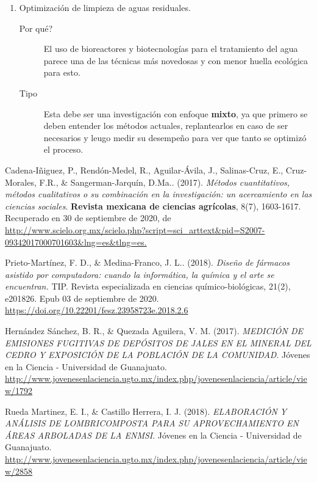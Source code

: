 \documentclass[12pt]{article}
\begin{document}
\begin{enumerate}
	\item Optimizaci\'on de limpieza de aguas residuales.
		\begin{description}
			\item [Por qu\'e?] El uso de bioreactores y biotecnolog\'ias para el tratamiento del agua parece una de las t\'ecnicas m\'as novedosas y con menor huella ecol\'ogica para esto.
			\item [Tipo] Esta debe ser una investigaci\'on con enfoque \textbf{mixto}, ya que primero se deben entender los m\'etodos actuales, replantearlos en caso de ser necesarios y leugo medir su desempe\~no para ver que tanto se optimiz\'o el proceso.
			
		\end{description}
\end{enumerate}


\newpage
\begin{thebibliography}{X}
	 Cadena-Iñiguez, P., Rendón-Medel, R., Aguilar-Ávila, J., Salinas-Cruz, E., Cruz-Morales, F.R., \& Sangerman-Jarquín, D.Ma.. (2017). \textit{Métodos cuantitativos, métodos cualitativos o su combinación en la investigación: un acercamiento en las ciencias sociales}. \textbf{Revista mexicana de ciencias agrícolas}, 8(7), 1603-1617. Recuperado en 30 de septiembre de 2020, de \url{http://www.scielo.org.mx/scielo.php?script=sci_arttext&pid=S2007-09342017000701603&lng=es&tlng=es.}

	 Prieto-Martínez, F. D., \& Medina-Franco, J. L.. (2018). \textit{Diseño de fármacos asistido por computadora: cuando la informática, la qu\'imica y el arte se encuentran.} TIP. Revista especializada en ciencias qu\'imico-biol\'ogicas, 21(2), e201826. Epub 03 de septiembre de 2020. \url{https://doi.org/10.22201/fesz.23958723e.2018.2.6}
	
	 Hernández Sánchez, B. R., \& Quezada Aguilera, V. M. (2017). \textit{MEDICIÓN DE EMISIONES FUGITIVAS DE DEPÓSITOS DE JALES EN EL MINERAL DEL CEDRO Y EXPOSICIÓN DE LA POBLACIÓN DE LA COMUNIDAD}. Jóvenes en la Ciencia - Universidad de Guanajuato. \url{http://www.jovenesenlaciencia.ugto.mx/index.php/jovenesenlaciencia/article/view/1792}
	
	 Rueda Martinez, E. I., \& Castillo Herrera, I. J. (2018). \textit{ELABORACIÓN Y ANÁLISIS DE LOMBRICOMPOSTA PARA SU APROVECHAMIENTO EN ÁREAS ARBOLADAS DE LA ENMSI}. {Jóvenes en la Ciencia - Universidad de Guanajuato}. \url{http://www.jovenesenlaciencia.ugto.mx/index.php/jovenesenlaciencia/article/view/2858}
	
\end{thebibliography}

	
\end{document}
